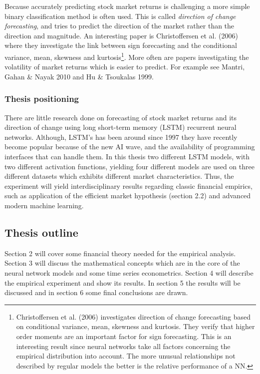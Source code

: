 \documentclass[12pt, letterpaper]{amsart}%
\begin{document}
Because accurately predicting stock market returns is challenging a more simple binary classification method is often used. This is called \textit{direction of change forecasting}, and tries to predict the direction of the market rather than the direction and magnitude. An interesting paper is Christoffersen et al. (2006) where they investigate the link between sign forecasting and the conditional variance, mean, skewness and kurtosis\footnote{Christoffersen et al. (2006) investigates direction of change forecasting based on conditional variance, mean, skewness and kurtosis. They verify that higher order moments are an important factor for sign forecasting. This is an interesting result since neural networks take all factors concerning the empirical distribution into account. The more unusual relationships not described by regular models the better is the relative performance of a NN.}. More often are papers investigating the volatility of market returns which is easier to predict. For example see Mantri, Gahan \& Nayak 2010 and Hu \& Tsoukalas 1999.

\subsubsection{Thesis positioning}
There are little research done on forecasting of stock market returns and its direction of change using long short-term memory (LSTM) recurrent neural networks. Although, LSTM's has been around since 1997 they have recently become popular because of the new AI wave, and the availability of programming interfaces that can handle them. In this thesis two different LSTM models, with two different activation functions, yielding four different models are used on three different datasets which exhibits different market characteristics. Thus, the experiment will yield interdisciplinary results regarding classic financial empirics, such as application of the efficient market hypothesis (section 2.2) and advanced modern machine learning.

\subsection{Thesis outline}
Section 2 will cover some financial theory needed for the empirical analysis. Section 3 will discuss the mathematical concepts which are in the core of the neural network models and some time series econometrics. Section 4 will describe the empirical experiment and show its results. In section 5 the results will be discussed and in section 6 some final conclusions are drawn.
\end{document}
